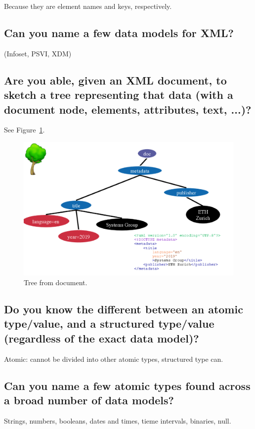 \documentclass{article}
\begin{document}
Because they are element names and keys, respectively.

\subsection{Can you name a few data models for XML?}

(Infoset, PSVI, XDM)

\subsection{Are you able, given an XML document, to sketch a tree representing that data (with a document node, elements, attributes, text, ...)?}

See Figure~\ref{fig:treefromdoc}.

\begin{figure}
  \centering
  \includegraphics[width=.8\textwidth]{img/treefromdoc.png}
  \caption{Tree from document.}
  \label{fig:treefromdoc}
\end{figure}

\subsection{Do you know the different between an atomic type/value, and a structured type/value (regardless of the exact data model)?}

Atomic: cannot be divided into other atomic types, structured type can.

\subsection{Can you name a few atomic types found across a broad number of data models?}

Strings, numbers, booleans, dates and times, tieme intervals, binaries, null.
\end{document}
